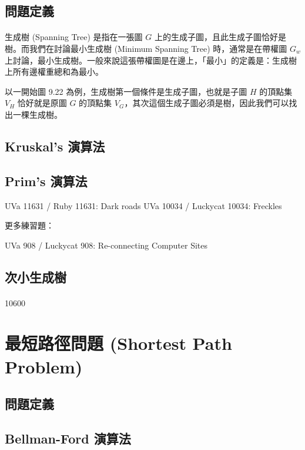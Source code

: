 \documentclass[12pt,a4paper,oneside]{report}
\begin{document}
\begin{CJK}{UTF8}{bkai}
\subsection{問題定義}

\paragraph{}生成樹 (Spanning Tree) 是指在一張圖 $G$ 上的生成子圖，且此生成子圖恰好是樹。而我們在討論最小生成樹 (Minimum Spanning Tree) 時，通常是在帶權圖 $G_w$ 上討論，最小生成樹。一般來說這張帶權圖是在邊上，「最小」的定義是：生成樹上所有邊權重總和為最小。

以一開始圖 9.22 為例，生成樹第一個條件是生成子圖，也就是子圖 $H$ 的頂點集 $V_H$ 恰好就是原圖 $G$ 的頂點集 $V_G$，其次這個生成子圖必須是樹，因此我們可以找出一棵生成樹。

\subsection{Kruskal's 演算法}
\subsection{Prim's 演算法}

UVa 11631 / Ruby 11631: Dark roads
UVa 10034 / Luckycat 10034: Freckles

更多練習題：

UVa 908 / Luckycat 908: Re-connecting Computer Sites

\subsection{次小生成樹}
\paragraph{}10600

\section{最短路徑問題 (Shortest Path Problem)}
\subsection{問題定義}
\subsection{Bellman-Ford 演算法}


\end{CJK}
\end{document}
